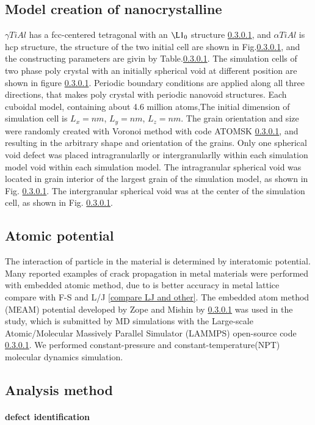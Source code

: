 \documentclass[final,5p,times,twocolumn]{elsarticle}
\begin{document}
\subsection{Model creation of nanocrystalline}
$\gamma  TiAl$ has a fcc-centered tetragonal with an $\L1_0$ structure \ref{}, and $\alpha TiAl$ is hcp structure, the structure of the two initial cell are shown in Fig.\ref{}, and the constructing parameters are givin by Table.\ref{}. The simulation cells of two phase poly crystal with an initially spherical void at different position are shown in figure \ref{}. Periodic boundary conditions are applied along all three directions, that makes poly crystal with periodic nanovoid structures. Each cuboidal model, containing about 4.6 million atoms,The initial dimension of simulation cell is  $L_x = nm$, $L_y =  nm$, $L_z =  nm$. The grain orientation and size were randomly created with Voronoi method with code ATOMSK \ref{}, and resulting in the arbitrary shape and orientation of the grains. Only one spherical void defect was placed intragranularlly or intergranularlly within each simulation model void within each simulation model. The intragranular spherical void was located in grain interior of the largest grain of the simulation model, as shown in Fig. \ref{}. The intergranular spherical void was at the center of the simulation cell, as shown in Fig. \ref{}.

\subsection{Atomic potential}
The interaction of particle in the material is determined by interatomic potential. Many reported examples of crack propagation in metal materials were performed with embedded atomic method, due to is better accuracy in metal lattice compare with F-S and L/J \ref{compare LJ and other}. The embedded atom method (MEAM) potential developed by Zope and Mishin by \ref{} was used in the study, which is submitted by MD simulations with the Large-scale Atomic/Molecular Massively Parallel Simulator (LAMMPS) open-source code \ref{}. We performed constant-pressure and constant-temperature(NPT) molecular dynamics simulation.
\subsection{Analysis method}

\paragraph{defect identification}
\end{document}
